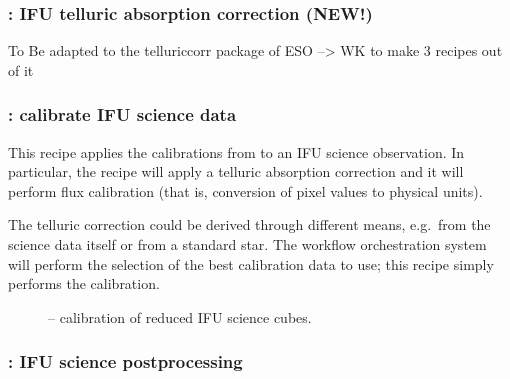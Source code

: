 \clearpage
\subsubsection{: IFU telluric absorption correction (NEW!)}
\label{sssec:ifu_telluric_new}
\label{rec:metis_ifu_telluric_new}
To Be adapted to the telluriccorr package of ESO --> WK to make 3 recipes out of it


\clearpage
\subsubsection{: calibrate IFU science data}\label{rec:metis_ifu_calibrate}
\label{sssec:ifu_calibrate}

This recipe applies the calibrations from  to an
\ac{IFU} science observation.
In particular, the recipe will apply a telluric absorption correction and it
will perform flux calibration (that is, conversion of pixel values to physical
units).

The telluric correction could be derived through different means, e.g.~from
the science data itself or from a standard star.
The workflow orchestration system will perform the selection of the best
calibration data to use; this recipe simply performs the calibration.



\begin{figure}[hb]
  \centering
    \def \globalscale {0.700000}
    \fontsize{10}{12}\selectfont
    
  \caption[Recipe: ]{
    -- calibration of reduced IFU science cubes.}
  \label{fig:metis_ifu_calibrate}
\end{figure}


\clearpage
\subsubsection{: IFU science postprocessing}
\label{sssec:ifu_sci_postprocess}\label{sssec:ifu_postprocess}
\label{rec:metis_ifu_postprocess}

